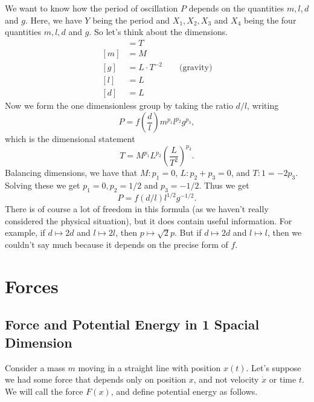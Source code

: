\documentclass[a4paper]{scrreprt}
\begin{document}
\begin{example}
\begin{center}
	
	\end{center}
	We want to know how the period of oscillation $P$ depends on the quantities $m, l, d$ and $g$. Here, we have $Y$ being the period and $X_1, X_2, X_3$ and $X_4$ being the four quantities $m, l, d$ and $g$. So let's think about the dimensions.
	\begin{align*}
		[P] &= T \\
		[m] &= M\\
		[g] &= L \cdot T^{-2} \quad \quad \text{(gravity)} \\
		[l] &= L\\
		[d] &= L
	\end{align*}
	Now we form the one dimensionless group by taking the ratio $d/l$, writing
	$$
	P = f\left(\frac{d}{l}\right) m^{p_1} l^{p_2} g^{p_3},
	$$
	which is the dimensional statement
	$$
	T = M^{p_1} L^{p_2} \left(\frac{L}{T^2}\right)^{p_3}.
	$$
	Balancing dimensions, we have that $M: p_1 = 0$, $L: p_2 + p_3 = 0$, and $T: 1 = -2p_3$. Solving these we get $p_1 = 0, p_2 = 1/2$ and $p_3 = -1/2$. Thus we get
	$$
	P = f(d/l) l^{1/2} g^{-1/2}.
	$$
	There is of course a lot of freedom in this formula (as we haven't really considered the physical situation), but it does contain useful information. For example, if $d \mapsto 2d$ and $l \mapsto 2l$, then $p \mapsto \sqrt{2}p$. But if $d \mapsto 2d$ and $l \mapsto l$, then we couldn't say much because it depends on the precise form of $f$. 
\end{example}

\chapter{Forces}

\section{Force and Potential Energy in 1 Spacial Dimension}

Consider a mass $m$ moving in a straight line with position $x(t)$.
Let's suppose we had some force that depends only on position $x$, and not velocity $\dot{x}$ or time $t$.
We will call the force $F(x)$, and define potential energy as follows.
\end{document}
